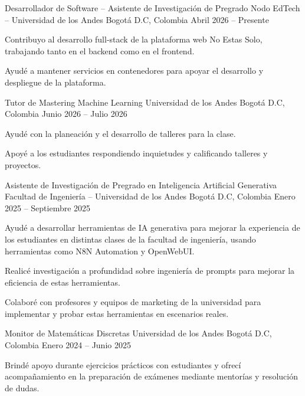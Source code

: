 \documentclass[11pt, a4paper]{awesome-cv}
\begin{document}
\begin{cventries}

  \cventry
    {Desarrollador de Software -- Asistente de Investigaci\'on de Pregrado}
    {Nodo EdTech -- Universidad de los Andes}
    {Bogot\'a D.C, Colombia}
    {Abril 2026 -- Presente}
    {
      \begin{cvitems}
        \item {Contribuyo al desarrollo full-stack de la plataforma web No Estas Solo, trabajando tanto en el backend como en el frontend.}
        \item {Ayud\'e a mantener servicios en contenedores para apoyar el desarrollo y despliegue de la plataforma.}
      \end{cvitems}
    }

  \cventry
    {Tutor de Mastering Machine Learning}
    {Universidad de los Andes}
    {Bogot\'a D.C, Colombia}
    {Junio 2026 -- Julio 2026}
    {
      \begin{cvitems}
        \item {Ayud\'e con la planeaci\'on y el desarrollo de talleres para la clase.}
        \item {Apoy\'e a los estudiantes respondiendo inquietudes y calificando talleres y proyectos.}
      \end{cvitems}
    }

  \cventry
    {Asistente de Investigaci\'on de Pregrado en Inteligencia Artificial Generativa}
    {Facultad de Ingenier\'ia -- Universidad de los Andes}
    {Bogot\'a D.C, Colombia}
    {Enero 2025 -- Septiembre 2025}
    {
      \begin{cvitems}
        \item {Ayud\'e a desarrollar herramientas de IA generativa para mejorar la experiencia de los estudiantes en distintas clases de la facultad de ingenier\'ia, usando herramientas como N8N Automation y OpenWebUI.}
        \item {Realic\'e investigaci\'on a profundidad sobre ingenier\'ia de prompts para mejorar la eficiencia de estas herramientas.}
        \item {Colabor\'e con profesores y equipos de marketing de la universidad para implementar y probar estas herramientas en escenarios reales.}
      \end{cvitems}
    }

  \cventry
    {Monitor de Matem\'aticas Discretas}
    {Universidad de los Andes}
    {Bogot\'a D.C, Colombia}
    {Enero 2024 -- Junio 2025}
    {
      \begin{cvitems}
        \item {Brind\'e apoyo durante ejercicios pr\'acticos con estudiantes y ofrec\'i acompa\~namiento en la preparaci\'on de ex\'amenes mediante mentor\'ias y resoluci\'on de dudas.}
      \end{cvitems}
    }


\end{cventries}
\end{document}
